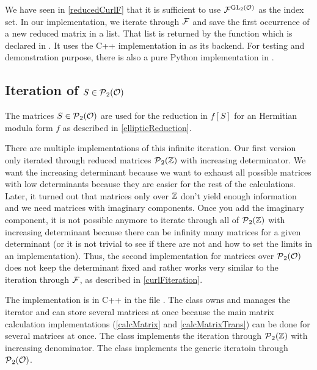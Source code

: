 We have seen in \cref{reducedCurlF} that it is sufficient to use ${\mathcal{F}}^{\operatorname{GL}_2(\mathcal{O})}$ as the index set. In our implementation, we iterate through $\mathcal{F}$ and save the first occurrence of a new reduced matrix in a list. That list is returned by the function  which is declared in . It uses the C++ implementation in  as its backend. For testing and demonstration purpose, there is also a pure Python implementation  in .


\subsection{Iteration of $S \in \operatorname{\mathcal{P}}_2(\mathcal{O})$}

The matrices $S \in \operatorname{\mathcal{P}}_2(\mathcal{O})$ are used for the reduction in $f[S]$ for an Hermitian modula form $f$ as described in \cref{ellipticReduction}.

There are multiple implementations of this infinite iteration. Our first version only iterated through reduced matrices $\operatorname{\mathcal{P}}_2(\mathbb{Z})$ with increasing determinator. We want the increasing determinant because we want to exhaust all possible matrices with low determinants because they are easier for the rest of the calculations. Later, it turned out that matrices only over $\mathbb{Z}$ don't yield enough information and we need matrices with imaginary components. Once you add the imaginary component, it is not possible anymore to iterate through all of $\operatorname{\mathcal{P}}_2(\mathbb{Z})$ with increasing determinant because there can be infinity many matrices for a given determinant (or it is not trivial to see if there are not and how to set the limits in an implementation). Thus, the second implementation for matrices over $\operatorname{\mathcal{P}}_2(\mathcal{O})$ does not keep the determinant fixed and rather works very similar to the iteration through $\mathcal{F}$, as described in \cref{curlFiteration}.

The implementation is in C++ in the file . The class  owns and manages the iterator and can store several matrices at once because the main matrix calculation implementations (\cref{calcMatrix} and \cref{calcMatrixTrans}) can be done for several matrices at once. The class  implements the iteration through $\operatorname{\mathcal{P}}_2(\mathbb{Z})$ with increasing denominator. The class  implements the generic iteratoin through $\operatorname{\mathcal{P}}_2(\mathcal{O})$.

